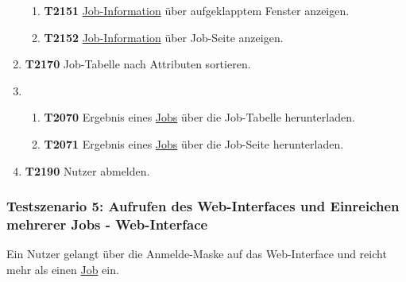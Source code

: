 \begin{enumerate}
\begin{enumerate}
        \item \textbf{T2151} \hyperref[B:Job-Informationen]{Job-Information} über aufgeklapptem Fenster anzeigen.
         
        \item \textbf{T2152} \hyperref[B:Job-Informationen]{Job-Information} über Job-Seite anzeigen. 
    \end{enumerate}
    
    \item \textbf{T2170} Job-Tabelle nach Attributen sortieren.
    
    \item
    \begin{enumerate}
        \item \textbf{T2070} Ergebnis eines \hyperref[B:Jobs]{Jobs} über die Job-Tabelle herunterladen.
        
        \item \textbf{T2071} Ergebnis eines \hyperref[B:Jobs]{Jobs} über die Job-Seite herunterladen. 
    \end{enumerate}
    
    \item \textbf{T2190} \gls{Nutzer} abmelden.

\end{enumerate}

\subsubsection{Testszenario 5: Aufrufen des Web-Interfaces und Einreichen mehrerer Jobs - Web-Interface}
Ein \gls{Nutzer} gelangt über die Anmelde-Maske auf das \gls{Web-Interface} und reicht mehr als einen \hyperref[B:Jobs]{Job} ein.

